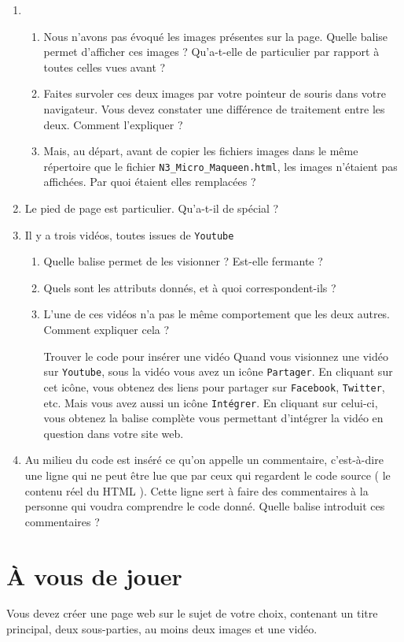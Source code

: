 \documentclass[a4paper,12pt]{article}
\begin{document}
\begin{enumerate}
\begin{enumerate}
\item Concernant les liens hypertextes de la page, les deux ne se comportent pas de la même manière. Comment expliquer cela ?
\item Toujours concernant les liens hypertextes, que doit-on renseigner pour donner la direction du lien ?
\end{enumerate}
\item \begin{enumerate}
\item Nous n'avons pas évoqué les images présentes sur la page. Quelle balise permet d'afficher ces images ? Qu'a-t-elle de particulier par rapport à toutes celles vues avant ?
\item Faites survoler ces deux images par votre pointeur de souris dans votre navigateur. Vous devez constater une différence de traitement entre les deux. Comment l'expliquer ?
\item Mais, au départ, avant de copier les fichiers images dans le même répertoire que le fichier \texttt{N3\_Micro\_Maqueen.html}, les images n'étaient pas affichées. Par quoi étaient elles remplacées ?

\end{enumerate}
\item Le pied de page est particulier. Qu'a-t-il de  spécial ?
\item Il y a trois vidéos, toutes issues de \texttt{Youtube}
\begin{enumerate}
\item Quelle balise permet de les visionner ? Est-elle fermante ? 
\item Quels sont les attributs donnés, et à quoi correspondent-ils ?
\item L'une de ces vidéos n'a pas le même comportement que les deux autres. Comment expliquer cela ?
\begin{info}{Trouver le code pour insérer une vidéo}
\noindent Quand vous visionnez une vidéo sur \texttt{Youtube}, sous la vidéo vous avez un icône \texttt{Partager}. En cliquant sur cet icône, vous obtenez des liens pour partager sur \texttt{Facebook}, \texttt{Twitter}, etc. Mais vous avez aussi un icône \texttt{Intégrer}. En cliquant sur celui-ci, vous obtenez la balise complète vous permettant d'intégrer la vidéo en question dans votre site web.
\end{info}
\end{enumerate}
\item Au milieu du code est inséré ce qu'on appelle un commentaire, c'est-à-dire une ligne qui ne peut être lue que par ceux qui regardent le code source ( le contenu réel du HTML ). Cette ligne sert à faire des commentaires à la personne qui voudra comprendre le code donné. Quelle balise introduit ces commentaires ?
\end{enumerate}
\section{\`A vous de jouer}
\noindent Vous devez créer une page web sur le sujet de votre choix, contenant un titre principal, deux sous-parties, au moins deux images et une vidéo.
\end{document}
